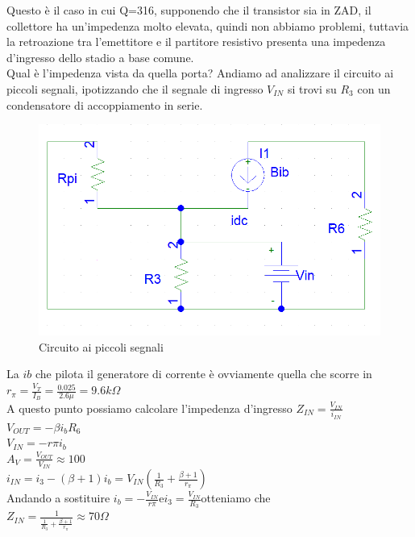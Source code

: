 \documentclass{article}
\begin{document}
Questo è il caso in cui Q=316, supponendo che il transistor sia in ZAD, il collettore ha un'impedenza molto elevata, quindi non abbiamo problemi, tuttavia la retroazione tra l'emettitore e il partitore resistivo presenta una impedenza d'ingresso dello stadio a base comune.\\
Qual è l'impedenza vista da quella porta? Andiamo ad analizzare il circuito ai piccoli segnali, ipotizzando che il segnale di ingresso $V_{IN}$ si trovi su $R_3$ con un condensatore di accoppiamento in serie.
~\begin{figure}[H]
\includegraphics[scale=0.5]{PiccoliSegnali.png}
\centering
\caption{Circuito ai piccoli segnali}
\label{fig:foo}
\end{figure}
La $ib$ che pilota il generatore di corrente è ovviamente quella che scorre in \Large$r_\pi=\frac{V_T}{I_B}=\frac{0.025}{2.6\mu }=9.6k\Omega$\\\normalsize
A questo punto possiamo calcolare l'impedenza d'ingresso \Large$Z_{IN}=\frac{V_{IN}}{i_{IN}}$\\
$V_{OUT}=- \beta i_b R_6$\\$V_{IN}=-r \pi i_b$\\
$A_V=\frac{V_{OUT}}{V_{IN}}\approx 100$\\
$i_{IN}=i_3-(\beta +1)i_b=V_{IN}(\frac{1}{R_3}+\frac{\beta +1}{r_\pi})$\\
\normalsize Andando a sostituire \Large$i_b=-\frac{V_{IN}}{r\pi}$\normalsize e\Large $i_3=\frac{V_{IN}}{R_3}$\normalsize otteniamo che \\
\Large $Z_{IN}=\frac{1}{\frac{1}{R_3}+\frac{\beta +1}{r_\pi}}\approx 70\Omega$\normalsize
\end{document}
